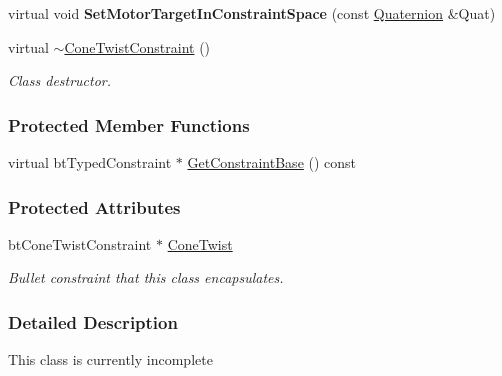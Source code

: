 \begin{DoxyCompactItemize}
\item 
\hypertarget{classphys_1_1ConeTwistConstraint_a93de5088b8ce6ce997f202d627cf9314}{
virtual void {\bfseries SetMotorTargetInConstraintSpace} (const \hyperlink{classphys_1_1Quaternion}{Quaternion} \&Quat)}
\label{classphys_1_1ConeTwistConstraint_a93de5088b8ce6ce997f202d627cf9314}

\item 
virtual \hyperlink{classphys_1_1ConeTwistConstraint_a5909ff2028cbed6c13fd51dbd2b8d63d}{$\sim$ConeTwistConstraint} ()
\begin{DoxyCompactList}\small\item\em Class destructor. \item\end{DoxyCompactList}\end{DoxyCompactItemize}
\subsubsection*{Protected Member Functions}
\begin{DoxyCompactItemize}
\item 
virtual btTypedConstraint $\ast$ \hyperlink{classphys_1_1ConeTwistConstraint_a564246e0fabe2b0edb72c7080d7020ff}{GetConstraintBase} () const 
\end{DoxyCompactItemize}
\subsubsection*{Protected Attributes}
\begin{DoxyCompactItemize}
\item 
\hypertarget{classphys_1_1ConeTwistConstraint_a6bb25f6554b09cc9ce3afb7e1c46f074}{
btConeTwistConstraint $\ast$ \hyperlink{classphys_1_1ConeTwistConstraint_a6bb25f6554b09cc9ce3afb7e1c46f074}{ConeTwist}}
\label{classphys_1_1ConeTwistConstraint_a6bb25f6554b09cc9ce3afb7e1c46f074}

\begin{DoxyCompactList}\small\item\em Bullet constraint that this class encapsulates. \item\end{DoxyCompactList}\end{DoxyCompactItemize}


\subsubsection{Detailed Description}
This class is currently incomplete 

